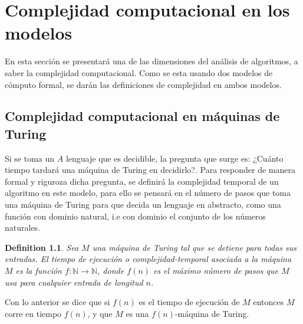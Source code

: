 \documentclass[10pt]{report}
\newtheorem{definition}{Definition}
\begin{document}
    \chapter{Complejidad computacional en los modelos}
    En esta sección se presentará una de las dimensiones del análisis de algoritmos, a saber la complejidad computacional.
    Como se esta usando dos modelos de cómputo formal, se darán las definiciones de complejidad en ambos modelos.

    \section{Complejidad computacional en máquinas de Turing}
    Si se toma un $A$ lenguaje que es decidible, la pregunta que surge es: ¿Cuánto tiempo tardará una máquina de Turing
    en decidirlo?.
    Para responder de manera formal y riguroza dicha pregunta, se definirá la complejidad temporal de un algoritmo
    en este modelo, para ello se pensará en el número de pasos que toma una máquina de Turing para que decida un lenguaje
    en abstracto, como una función con dominio natural, i.e con dominio el conjunto de los números naturales.

    \begin{definition}
        Sea $M$ una máquina de Turing tal que se detiene para todas sus entradas.\newline
        El tiempo de ejecución o complejidad-temporal asociada a la máquina $M$ es la función
        $f:\mathbb{N}\rightarrow\mathbb{N} $, donde $f(n)$ es el máximo número de pasos que $M$ usa para cualquier entrada de
        longitud $n$.
    \end{definition}
    Con lo anterior se dice que si $f(n)$ es el tiempo de ejecución de $M$ entonces $M$ corre en tiempo $f(n)$,
    y que $M$ es una $f(n)$-máquina de Turing.
\end{document}
